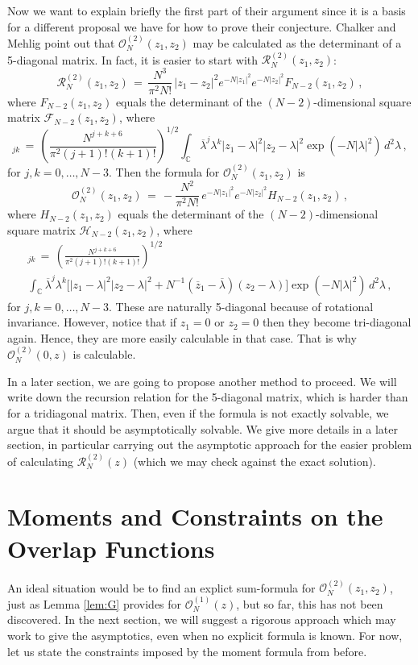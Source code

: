 \documentclass[12pt]{report}
\newcommand{\C}{\mathbb{C}}
\newcommand{\be}{\begin{equation}}
\newcommand{\ee}{\end{equation}}
\theoremstyle{definition}
\begin{document}
Now we want to explain briefly the first part of their argument since it is a basis for a different proposal
we have for how to prove their conjecture.
Chalker and Mehlig point out that $\mathcal{O}_N^{(2)}(z_1,z_2)$ may be calculated as the determinant of a 5-diagonal matrix.
In fact, it is easier to start with $\mathcal{R}_N^{(2)}(z_1,z_2)$:
\be
\mathcal{R}_N^{(2)}(z_1,z_2)\, 
=\, \frac{N^3}{\pi^2 N!}\, |z_1-z_2|^2 e^{-N|z_1|^2} e^{-N|z_2|^2} F_{N-2}(z_1,z_2)\, ,
\ee
where $F_{N-2}(z_1,z_2)$ equals the determinant of the $(N-2)$-dimensional square matrix $\mathcal{F}_{N-2}(z_1,z_2)$, where
\be
[\mathcal{F}_{N-2}(z_1,z_2)]_{jk}\, =\, \left(\frac{N^{j+k+6}}{\pi^2 (j+1)! (k+1)! }\right)^{1/2} \int_{\C} \overline{\lambda}^j \lambda^k |z_1-\lambda|^2 |z_2-\lambda|^2 
\exp(-N|\lambda|^2)\, d^2\lambda\, ,
\ee
for $j,k=0,\dots,N-3$. Then the formula for $\mathcal{O}_N^{(2)}(z_1,z_2)$ is 
\be
\mathcal{O}_N^{(2)}(z_1,z_2)\, 
=\, -\frac{N^2}{\pi^2 N!}\, e^{-N|z_1|^2} e^{-N|z_2|^2} H_{N-2}(z_1,z_2)\, ,
\ee
where $H_{N-2}(z_1,z_2)$ equals the determinant of the $(N-2)$-dimensional square matrix $\mathcal{H}_{N-2}(z_1,z_2)$, where
\begin{multline}
[\mathcal{H}_{N-2}(z_1,z_2)]_{jk}\, =  \, \left(\frac{N^{j+k+6}}{\pi^2 (j+1)! (k+1)! }\right)^{1/2} \\  \int_{\C} \overline{\lambda}^j \lambda^k \Big[|z_1-\lambda|^2 |z_2-\lambda|^2 
+ N^{-1} \left(\overline{z}_1 - \overline{\lambda}\right)(z_2-\lambda)\Big]
\exp(-N|\lambda|^2)\, d^2\lambda\, ,
\end{multline}
for $j,k=0,\dots,N-3$.
These are naturally 5-diagonal because of rotational invariance. However, notice that if $z_1=0$ or $z_2=0$ then they become tri-diagonal again.
Hence, they are more easily calculable in that case.
That is why $\mathcal{O}_N^{(2)}(0,z)$ is calculable.

In a later section, we are going to propose another method to proceed.
We will write down the recursion relation for the 5-diagonal matrix, which is harder than for a tridiagonal
matrix.
Then, even if the formula is not exactly solvable, we argue that it should be asymptotically
solvable.
We give more details in a later section, in particular carrying out the asymptotic approach for the easier
problem of calculating $\mathcal{R}_N^{(2)}(z)$ (which we may check against the exact solution).

\section{Moments and Constraints on the Overlap Functions}
An ideal situation would be to find an explict sum-formula for $\mathcal{O}_N^{(2)}(z_1,z_2)$, just as Lemma \ref{lem:G}
provides for $\mathcal{O}_N^{(1)}(z)$,
but so far, this has not been discovered.
In the next section, we will suggest a rigorous approach which may work to give the asymptotics, even when no explicit formula is known.
For now, let us state the constraints imposed by the moment formula from before.
\end{document}
